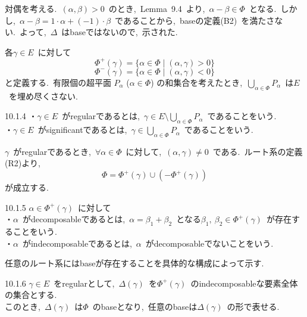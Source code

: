 \documentclass[uplatex,dvipdfmx]{jsarticle}
\begin{document}
\begin{myproof}
    対偶を考える.~$(\alpha, \beta) > 0$~のとき,~Lemma~9.4~より,~$\alpha - \beta \in \Phi$~となる.~しかし,~$\alpha -\beta = 1\cdot \alpha + (-1)\cdot \beta$~であることから,~baseの定義(B2)~を満たさない.~よって,~$\Delta$~はbaseではないので,~示された.\\
\end{myproof}
各$\gamma \in E$~に対して
\begin{equation*}
    \Phi^+(\gamma) = \{\alpha \in \Phi \mid (\alpha, \gamma) > 0\}
\end{equation*}
\begin{equation*}
    \Phi^-(\gamma) = \{\alpha \in \Phi \mid (\alpha, \gamma) < 0\}
\end{equation*}
と定義する.~有限個の超平面 $P_\alpha$ ($\alpha \in \Phi$) の和集合を考えたとき,~$\bigcup_{\alpha \in \Phi} P_\alpha$~は$E$~を埋め尽くさない.
\begin{mydef}{10.1.4}
    ・$\gamma \in E$~がregularであるとは,~$\gamma \in E\setminus \bigcup_{\alpha \in \Phi} P_\alpha$~であることをいう.~\\
    ・$\gamma \in E$~がsignificantであるとは,~$\gamma \in \bigcup_{\alpha \in \Phi} P_\alpha$~であることをいう.
\end{mydef}
$\gamma$~がregularであるとき,~$\forall \alpha \in \Phi$~に対して,~$(\alpha, \gamma) \neq 0$~である.~ルート系の定義(R2)より,
\begin{equation*}
    \Phi = \Phi^+(\gamma) \cup (-\Phi^+(\gamma))
\end{equation*}
が成立する.~
\begin{mydef}{10.1.5}
    $\alpha \in \Phi^+(\gamma)$~に対して\\
    ・$\alpha$~がdecomposableであるとは,~$\alpha = \beta_1 + \beta_2$~となる$\beta_1,~\beta_2 \in \Phi^+(\gamma)$~が存在することをいう.~\\
    ・$\alpha$~がindecomposableであるとは,~$\alpha$~がdecomposableでないことをいう.
\end{mydef}
任意のルート系にはbaseが存在することを具体的な構成によって示す.
\begin{mythm}{10.1.6}
    $\gamma \in E$~をregularとして,~$\Delta(\gamma)$~を$\Phi^+(\gamma)$~のindecomposableな要素全体の集合とする.~\\
    このとき,~$\Delta(\gamma)$~は$\Phi$~のbaseとなり,~任意のbaseは$\Delta(\gamma)$~の形で表せる.
\end{mythm}
\end{document}
